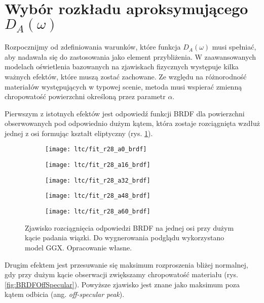 \documentclass[../main.tex]{subfiles}
\begin{document}
\section{Wybór rozkładu aproksymującego $D_A(\omega)$}

Rozpocznijmy od zdefiniowania warunków, które funkcja $D_A(\omega)$ musi spełniać, aby nadawała się do zastosowania jako element przybliżenia. W zaawansowanych modelach oświetlenia bazowanych na zjawiskach fizycznych występuje kilka ważnych efektów, które muszą zostać zachowane. Ze względu na różnorodność materiałów występujących w typowej scenie, metoda musi wspierać zmienną chropowatość powierzchni określoną przez parametr $\alpha$.

Pierwszym z istotnych efektów jest odpowiedź funkcji BRDF dla powierzchni obserwowanych pod odpowiednio dużym kątem, która zostaje rozciągnięta wzdłuż jednej z osi formując kształt eliptyczny (rys. \ref{fig:BRDFGrazingAnisotropy}).

\begin{figure}
    \centering
    
    \begin{subfigure}[t]{0.18\textwidth}
        \texttt{[image: ltc/fit\_r28\_a0\_brdf]}
    \end{subfigure}
    \begin{subfigure}[t]{0.18\textwidth}
        \texttt{[image: ltc/fit\_r28\_a16\_brdf]}
    \end{subfigure}
    \begin{subfigure}[t]{0.18\textwidth}
        \texttt{[image: ltc/fit\_r28\_a32\_brdf]}
    \end{subfigure}
    \begin{subfigure}[t]{0.18\textwidth}
        \texttt{[image: ltc/fit\_r28\_a48\_brdf]}
    \end{subfigure}
    \begin{subfigure}[t]{0.18\textwidth}
        \texttt{[image: ltc/fit\_r28\_a60\_brdf]}
    \end{subfigure}
    
    \caption{Zjawisko rozciągnięcia odpowiedzi BRDF na jednej osi przy dużym kącie padania wiązki. Do wygnerowania podglądu wykorzystano model GGX. Opracowanie własne.}
    \label{fig:BRDFGrazingAnisotropy}
\end{figure}

Drugim efektem jest przesuwanie się maksimum rozproszenia bliżej normalnej, gdy przy dużym kącie obserwacji zwiększamy chropowatość materiału (rys. \ref{fig:BRDFOffSpecular}). Powyższe zjawisko jest znane jako maksimum poza kątem odbicia (ang. \textit{off-specular peak}).
\end{document}
